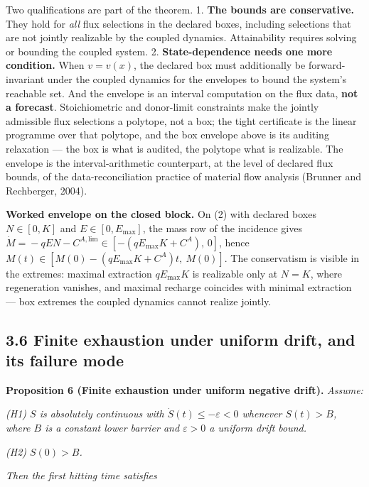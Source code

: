 \documentclass[11pt]{article}
\begin{document}
Two qualifications are part of the theorem. 1. \textbf{The bounds are conservative.} They hold for \emph{all} flux selections in the declared boxes, including selections that are not jointly realizable by the coupled dynamics. Attainability requires solving or bounding the coupled system. 2. \textbf{State-dependence needs one more condition.} When \(v=v(x)\), the declared box must additionally be forward-invariant under the coupled dynamics for the envelopes to bound the system's reachable set. And the envelope is an interval computation on the flux data, \textbf{not a forecast}. Stoichiometric and donor-limit constraints make the jointly admissible flux selections a polytope, not a box; the tight certificate is the linear programme over that polytope, and the box envelope above is its auditing relaxation --- the box is what is audited, the polytope what is realizable. The envelope is the interval-arithmetic counterpart, at the level of declared flux bounds, of the data-reconciliation practice of material flow analysis (Brunner and Rechberger, 2004).

\textbf{Worked envelope on the closed block.} On (2) with declared boxes \(N \in [0, K]\) and \(E \in [0, E_{\max}]\), the mass row of the incidence gives \(\dot M =\allowbreak{} -qEN - C^{A,\allowbreak{}\mathrm{lim}} \in [-(qE_{\max}K +\allowbreak{} C^A),\allowbreak{}\,\allowbreak{} 0]\), hence \(M(t) \in [M(0) - (qE_{\max}K +\allowbreak{} C^A)t,\allowbreak{}\ M(0)]\). The conservatism is visible in the extremes: maximal extraction \(qE_{\max}K\) is realizable only at \(N=K\), where regeneration vanishes, and maximal recharge coincides with minimal extraction --- box extremes the coupled dynamics cannot realize jointly.

\subsection*{3.6 Finite exhaustion under uniform drift, and its failure mode}\label{36-finite-exhaustion-under-uniform-drift-and-its-failure-mode}

\textbf{Proposition 6 (Finite exhaustion under uniform negative drift).} \emph{Assume:}

\emph{(H1) \(S\) is absolutely continuous with \(\dot S(t) \le -\varepsilon < 0\) whenever \(S(t) > B\), where \(B\) is a constant lower barrier and \(\varepsilon > 0\) a uniform drift bound.}

\emph{(H2) \(S(0) > B\).}

\emph{Then the first hitting time satisfies} 
\end{document}

